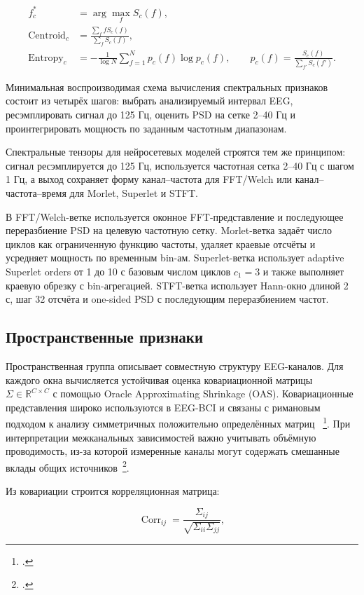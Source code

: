 \begin{align}
f^{\ast}_c &= \arg\max_f S_c(f), \\
\operatorname{Centroid}_c &=
\frac{\sum_f f S_c(f)}{\sum_f S_c(f)}, \\
\operatorname{Entropy}_c &=
-\frac{1}{\log N}\sum_{f=1}^{N} p_c(f)\log p_c(f),
\qquad
p_c(f) = \frac{S_c(f)}{\sum_{f'}S_c(f')}.
\end{align}

Минимальная воспроизводимая схема вычисления спектральных признаков состоит
из четырёх шагов: выбрать анализируемый интервал EEG, ресэмплировать сигнал
до 125 Гц, оценить PSD на сетке 2--40 Гц и проинтегрировать мощность по
заданным частотным диапазонам.

Спектральные тензоры для нейросетевых моделей
строятся тем же принципом: сигнал ресэмплируется до 125 Гц, используется
частотная сетка 2--40 Гц с шагом 1 Гц, а выход сохраняет форму
канал--частота для FFT/Welch или канал--частота--время для Morlet, Superlet
и STFT.

В FFT/Welch-ветке используется оконное FFT-представление и последующее
переразбиение PSD на целевую частотную сетку. Morlet-ветка задаёт число
циклов как ограниченную функцию частоты, удаляет краевые отсчёты и усредняет
мощность по временным bin-ам. Superlet-ветка использует adaptive Superlet
orders от 1 до 10 с базовым числом циклов $c_1=3$ и также выполняет
краевую обрезку с bin-агрегацией. STFT-ветка использует Hann-окно длиной
2 с, шаг 32 отсчёта и one-sided PSD с последующим переразбиением частот.

\subsection*{Пространственные признаки}

Пространственная группа описывает совместную структуру EEG-каналов. Для
каждого окна вычисляется устойчивая оценка ковариационной матрицы
$\Sigma \in \mathbb{R}^{C \times C}$ с помощью Oracle Approximating Shrinkage
(OAS). Ковариационные представления широко используются в EEG-BCI и связаны
с римановым подходом к анализу симметричных положительно определённых матриц
~\footcite{10.1080/2326263x.2017.1297192}. При интерпретации межканальных
зависимостей важно учитывать объёмную проводимость, из-за которой измеренные
каналы могут содержать смешанные вклады общих источников~\footcite{10.1002/hbm.20745}.

Из ковариации строится корреляционная матрица:

\begin{equation}
\operatorname{Corr}_{ij} =
\frac{\Sigma_{ij}}{\sqrt{\Sigma_{ii}\Sigma_{jj}}},
\end{equation}

